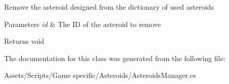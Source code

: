 Remove the asteroid designed from the dictionary of used asteroids 


\begin{DoxyParams}{Parameters}
{\em id} & The I\-D of the asteroid to remove\\
\hline
\end{DoxyParams}
\begin{DoxyReturn}{Returns}
void
\end{DoxyReturn}


The documentation for this class was generated from the following file\-:\begin{DoxyCompactItemize}
\item 
Assets/\-Scripts/\-Game specific/\-Asteroids/Asteroids\-Manager.\-cs\end{DoxyCompactItemize}
